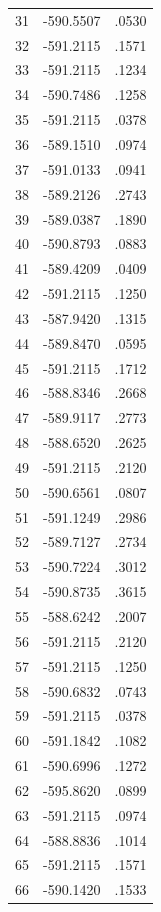 \documentclass[a4paper,12pt]{article}
\begin{document}
\begin{table}[!htbp]
\begin{tabular}{|c|c|c|}
        31 & -590.5507 & .0530 \\
        32 & -591.2115 & .1571 \\
        33 & -591.2115 & .1234 \\
        34 & -590.7486 & .1258 \\
        35 & -591.2115 & .0378 \\
        36 & -589.1510 & .0974 \\
        37 & -591.0133 & .0941 \\
        38 & -589.2126 & .2743 \\
        39 & -589.0387 & .1890 \\
        40 & -590.8793 & .0883 \\
        41 & -589.4209 & .0409 \\
        42 & -591.2115 & .1250 \\
        43 & -587.9420 & .1315 \\
        44 & -589.8470 & .0595 \\
        45 & -591.2115 & .1712 \\
        46 & -588.8346 & .2668 \\
        47 & -589.9117 & .2773 \\
        48 & -588.6520 & .2625 \\
        49 & -591.2115 & .2120 \\
        50 & -590.6561 & .0807 \\
        51 & -591.1249 & .2986 \\
        52 & -589.7127 & .2734 \\
        53 & -590.7224 & .3012 \\
        54 & -590.8735 & .3615 \\
        55 & -588.6242 & .2007 \\
        56 & -591.2115 & .2120 \\
        57 & -591.2115 & .1250 \\
        58 & -590.6832 & .0743 \\
        59 & -591.2115 & .0378 \\
        60 & -591.1842 & .1082 \\
        61 & -590.6996 & .1272 \\
        62 & -595.8620 & .0899  \\
        63 & -591.2115 & .0974 \\
        64 & -588.8836 & .1014 \\
        65 & -591.2115 & .1571 \\
        66 & -590.1420 & .1533 \\

\end{tabular}
\end{table}
\end{document}
